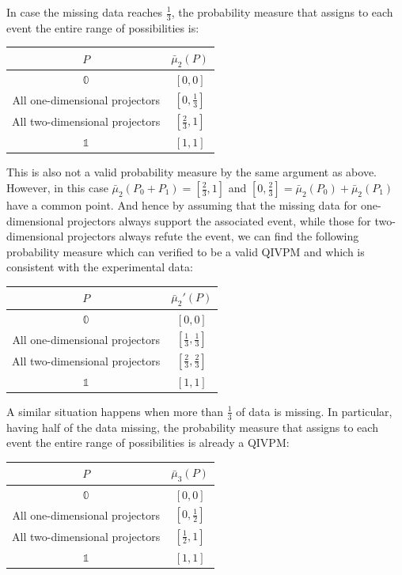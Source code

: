 \documentclass[english,reprint, aps, prl,superscriptaddress, showpacs,
showkeys, longbibliography, amsmath, amssymb, floatfix]{revtex4-1}
\theoremstyle{plain}
\theoremstyle{definition}
\newcommand{\imposs}{\ensuremath{\left[0,0\right]}}
\newcommand{\necess}{\ensuremath{\left[1,1\right]}}
\begin{document}
In case the missing data reaches $\frac{1}{3}$, the probability measure
that assigns to each event the entire range of possibilities is: 
\begin{center}
\begin{tabular}{cc}
\toprule 
\addlinespace
$P$  & $\bar{\mu}_{2}\left(P\right)$\tabularnewline
\midrule
\midrule 
\addlinespace
$\mathbb{0}$  & $\imposs$\tabularnewline
\midrule 
\addlinespace
All one-dimensional projectors  & $\left[0,\tfrac{1}{3}\right]$\tabularnewline
\midrule 
\addlinespace
All two-dimensional projectors  & $\left[\tfrac{2}{3},1\right]$\tabularnewline
\midrule 
\addlinespace
$\mathbb{1}$  & $\necess$\tabularnewline
\bottomrule
\end{tabular}
\par\end{center}

\noindent This is also not a valid probability measure by the same
argument as above. However, in this case $\bar{\mu}_{2}\left(P_{0}+P_{1}\right)=\left[\tfrac{2}{3},1\right]$
and $\left[0,\tfrac{2}{3}\right]=\bar{\mu}_{2}\left(P_{0}\right)+\bar{\mu}_{2}\left(P_{1}\right)$
have a common point. And hence by assuming that the missing data for
one-dimensional projectors always support the associated event, while
those for two-dimensional projectors always refute the event, we can
find the following probability measure which can verified to be a
valid QIVPM and which is consistent with the experimental data: 
\begin{center}
\begin{tabular}{cc}
\toprule 
\addlinespace
$P$  & $\bar{\mu}_{2}'\left(P\right)$\tabularnewline
\midrule
\midrule 
\addlinespace
$\mathbb{0}$  & $\imposs$\tabularnewline
\midrule 
\addlinespace
All one-dimensional projectors  & $\left[\tfrac{1}{3},\tfrac{1}{3}\right]$\tabularnewline
\midrule 
\addlinespace
All two-dimensional projectors  & $\left[\tfrac{2}{3},\tfrac{2}{3}\right]$\tabularnewline
\midrule 
\addlinespace
$\mathbb{1}$  & $\necess$\tabularnewline
\bottomrule
\end{tabular}
\par\end{center}

A similar situation happens when more than $\frac{1}{3}$ of data
is missing. In particular, having half of the data missing, the probability
measure that assigns to each event the entire range of possibilities
is already a QIVPM:
\begin{center}
\begin{tabular}{cc}
\toprule 
\addlinespace
$P$  & $\bar{\mu}_{3}\left(P\right)$\tabularnewline
\midrule
\midrule 
\addlinespace
$\mathbb{0}$  & $\imposs$\tabularnewline
\midrule 
\addlinespace
All one-dimensional projectors  & $\left[0,\tfrac{1}{2}\right]$\tabularnewline
\midrule 
\addlinespace
All two-dimensional projectors  & $\left[\tfrac{1}{2},1\right]$\tabularnewline
\midrule 
\addlinespace
$\mathbb{1}$  & $\necess$\tabularnewline
\bottomrule
\end{tabular}
\par\end{center}
\end{document}
